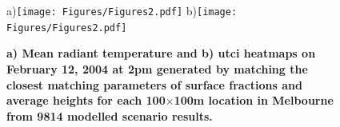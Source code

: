 \documentclass[final,3p,times,authoryear]{elsarticle}
\begin{document}







\begin{figure}
\centering
a)\texttt{[image: Figures/Figures2.pdf]}
b)\texttt{[image: Figures/Figures2.pdf]}
\caption{\bf a) Mean radiant temperature and b) \gls{utci} heatmaps on February 12, 2004 at 2pm generated by matching the closest matching parameters of surface fractions and average heights for each 100$\times$100m location in Melbourne from 9814 modelled scenario results.  }
 \label{fig:TmrtMelb}
 \label{fig:utciMelb}
\end{figure}
\end{document}
